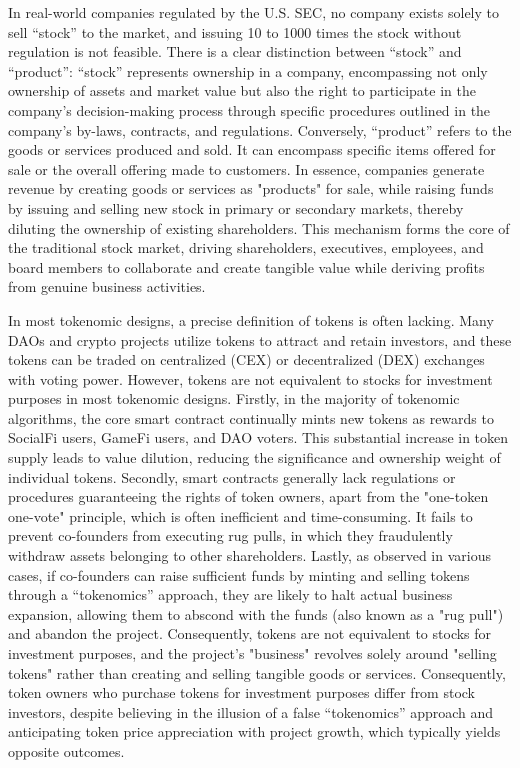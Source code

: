 \documentclass[main.tex]{subfiles}
\begin{document}
In real-world companies regulated by the U.S. SEC, no company exists solely to sell ``stock'' to the market, and issuing 10 to 1000 times the stock without regulation is not feasible. There is a clear distinction between ``stock'' and ``product'': ``stock'' represents ownership in a company, encompassing not only ownership of assets and market value but also the right to participate in the company's decision-making process through specific procedures outlined in the company's by-laws, contracts, and regulations. Conversely, ``product'' refers to the goods or services produced and sold. It can encompass specific items offered for sale or the overall offering made to customers. In essence, companies generate revenue by creating goods or services as "products" for sale, while raising funds by issuing and selling new stock in primary or secondary markets, thereby diluting the ownership of existing shareholders. This mechanism forms the core of the traditional stock market, driving shareholders, executives, employees, and board members to collaborate and create tangible value while deriving profits from genuine business activities.

In most tokenomic designs, a precise definition of tokens is often lacking. Many DAOs and crypto projects utilize tokens to attract and retain investors, and these tokens can be traded on centralized (CEX) or decentralized (DEX) exchanges with voting power. However, tokens are not equivalent to stocks for investment purposes in most tokenomic designs. Firstly, in the majority of tokenomic algorithms, the core smart contract continually mints new tokens as rewards to SocialFi users, GameFi users, and DAO voters. This substantial increase in token supply leads to value dilution, reducing the significance and ownership weight of individual tokens. Secondly, smart contracts generally lack regulations or procedures guaranteeing the rights of token owners, apart from the "one-token one-vote" principle, which is often inefficient and time-consuming. It fails to prevent co-founders from executing rug pulls, in which they fraudulently withdraw assets belonging to other shareholders. Lastly, as observed in various cases, if co-founders can raise sufficient funds by minting and selling tokens through a ``tokenomics'' approach, they are likely to halt actual business expansion, allowing them to abscond with the funds (also known as a "rug pull") and abandon the project. Consequently, tokens are not equivalent to stocks for investment purposes, and the project's "business" revolves solely around "selling tokens" rather than creating and selling tangible goods or services. Consequently, token owners who purchase tokens for investment purposes differ from stock investors, despite believing in the illusion of a false ``tokenomics'' approach and anticipating token price appreciation with project growth, which typically yields opposite outcomes.
\end{document}
